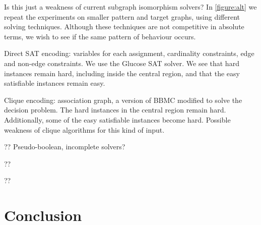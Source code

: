\documentclass[letterpaper]{article}
\begin{document}
Is this just a weakness of current subgraph isomorphism solvers? In \cref{figure:alt} we repeat the
experiments on smaller pattern and target graphs, using different solving techniques. Although these
techniques are not competitive in absolute terms, we wish to see if the same pattern of behaviour
occurs.

Direct SAT encoding: variables for each assignment, cardinality constraints, edge and non-edge
constraints. We use the Glucose SAT solver. We see that hard instances remain hard, including inside
the central region, and that the easy satisfiable instances remain easy.

Clique encoding: association graph, a version of BBMC modified to solve the decision problem. The
hard instances in the central region remain hard. Additionally, some of the easy satisfiable
instances become hard. Possible weakness of clique algorithms for this kind of input.

?? Pseudo-boolean, incomplete solvers?

?? \cite{Anton:2009}

?? \cite{Lipets:2009}

\section{Conclusion}



\end{document}
